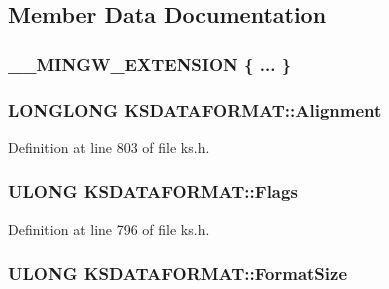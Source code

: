 \subsection{Member Data Documentation}
\subsubsection[{\texorpdfstring{"@183}{@183}}]{\setlength{\rightskip}{0pt plus 5cm}\+\_\+\+\_\+\+M\+I\+N\+G\+W\+\_\+\+E\+X\+T\+E\+N\+S\+I\+ON \{ ... \} }\hypertarget{union_k_s_d_a_t_a_f_o_r_m_a_t_acdea70125fc12f6262b67ce36b51eee4}{}\label{union_k_s_d_a_t_a_f_o_r_m_a_t_acdea70125fc12f6262b67ce36b51eee4}
\subsubsection[{\texorpdfstring{Alignment}{Alignment}}]{\setlength{\rightskip}{0pt plus 5cm}L\+O\+N\+G\+L\+O\+NG K\+S\+D\+A\+T\+A\+F\+O\+R\+M\+A\+T\+::\+Alignment}\hypertarget{union_k_s_d_a_t_a_f_o_r_m_a_t_a6d13f523a837ebe26372f32b740b02d7}{}\label{union_k_s_d_a_t_a_f_o_r_m_a_t_a6d13f523a837ebe26372f32b740b02d7}


Definition at line 803 of file ks.\+h.

\subsubsection[{\texorpdfstring{Flags}{Flags}}]{\setlength{\rightskip}{0pt plus 5cm}U\+L\+O\+NG K\+S\+D\+A\+T\+A\+F\+O\+R\+M\+A\+T\+::\+Flags}\hypertarget{union_k_s_d_a_t_a_f_o_r_m_a_t_a5ac62313a7451af29843a36ab8f36498}{}\label{union_k_s_d_a_t_a_f_o_r_m_a_t_a5ac62313a7451af29843a36ab8f36498}


Definition at line 796 of file ks.\+h.

\subsubsection[{\texorpdfstring{Format\+Size}{FormatSize}}]{\setlength{\rightskip}{0pt plus 5cm}U\+L\+O\+NG K\+S\+D\+A\+T\+A\+F\+O\+R\+M\+A\+T\+::\+Format\+Size}\hypertarget{union_k_s_d_a_t_a_f_o_r_m_a_t_aa23bba961cb89d7c270b76c997bc82bd}{}\label{union_k_s_d_a_t_a_f_o_r_m_a_t_aa23bba961cb89d7c270b76c997bc82bd}



